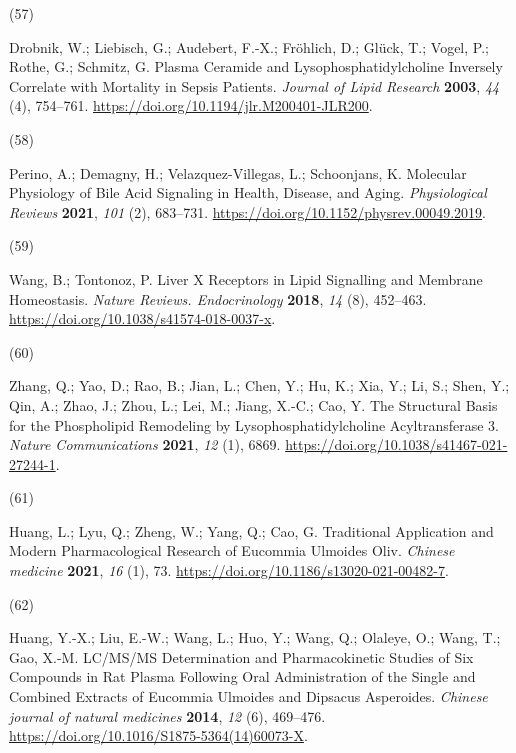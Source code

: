 \documentclass[
]{article}
\newlength{\cslhangindent}
\newlength{\csllabelwidth}
\newlength{\cslentryspacingunit} %
\newenvironment{CSLReferences}[2] %
 {%
  \setlength{\parindent}{0pt}
  \ifodd #1
  \let\oldpar\par
  \def\par{\hangindent=\cslhangindent\oldpar}
  \fi
  \setlength{\parskip}{#2\cslentryspacingunit}
 }%
 {}
\newcommand{\CSLLeftMargin}[1]{\parbox[t]{\csllabelwidth}{#1}}
\newcommand{\CSLRightInline}[1]{\parbox[t]{\linewidth - \csllabelwidth}{#1}\break}
\begin{document}
\begin{CSLReferences}{0}{0}
\leavevmode{}%
\CSLLeftMargin{(57) }%
\CSLRightInline{Drobnik, W.; Liebisch, G.; Audebert, F.-X.; Fröhlich,
D.; Glück, T.; Vogel, P.; Rothe, G.; Schmitz, G. Plasma Ceramide and
Lysophosphatidylcholine Inversely Correlate with Mortality in Sepsis
Patients. \emph{Journal of Lipid Research} \textbf{2003}, \emph{44} (4),
754--761. \url{https://doi.org/10.1194/jlr.M200401-JLR200}.}

\leavevmode{}%
\CSLLeftMargin{(58) }%
\CSLRightInline{Perino, A.; Demagny, H.; Velazquez-Villegas, L.;
Schoonjans, K. Molecular {Physiology} of {Bile Acid Signaling} in
{Health}, {Disease}, and {Aging}. \emph{Physiological Reviews}
\textbf{2021}, \emph{101} (2), 683--731.
\url{https://doi.org/10.1152/physrev.00049.2019}.}

\leavevmode{}%
\CSLLeftMargin{(59) }%
\CSLRightInline{Wang, B.; Tontonoz, P. Liver {X} Receptors in Lipid
Signalling and Membrane Homeostasis. \emph{Nature Reviews.
Endocrinology} \textbf{2018}, \emph{14} (8), 452--463.
\url{https://doi.org/10.1038/s41574-018-0037-x}.}

\leavevmode{}%
\CSLLeftMargin{(60) }%
\CSLRightInline{Zhang, Q.; Yao, D.; Rao, B.; Jian, L.; Chen, Y.; Hu, K.;
Xia, Y.; Li, S.; Shen, Y.; Qin, A.; Zhao, J.; Zhou, L.; Lei, M.; Jiang,
X.-C.; Cao, Y. The Structural Basis for the Phospholipid Remodeling by
Lysophosphatidylcholine Acyltransferase 3. \emph{Nature Communications}
\textbf{2021}, \emph{12} (1), 6869.
\url{https://doi.org/10.1038/s41467-021-27244-1}.}

\leavevmode{}%
\CSLLeftMargin{(61) }%
\CSLRightInline{Huang, L.; Lyu, Q.; Zheng, W.; Yang, Q.; Cao, G.
Traditional Application and Modern Pharmacological Research of
{Eucommia} Ulmoides {Oliv}. \emph{Chinese medicine} \textbf{2021},
\emph{16} (1), 73. \url{https://doi.org/10.1186/s13020-021-00482-7}.}

\leavevmode{}%
\CSLLeftMargin{(62) }%
\CSLRightInline{Huang, Y.-X.; Liu, E.-W.; Wang, L.; Huo, Y.; Wang, Q.;
Olaleye, O.; Wang, T.; Gao, X.-M. {LC}/{MS}/{MS} Determination and
Pharmacokinetic Studies of Six Compounds in Rat Plasma Following Oral
Administration of the Single and Combined Extracts of {Eucommia}
Ulmoides and {Dipsacus} Asperoides. \emph{Chinese journal of natural
medicines} \textbf{2014}, \emph{12} (6), 469--476.
\url{https://doi.org/10.1016/S1875-5364(14)60073-X}.}


\end{CSLReferences}
\end{document}

